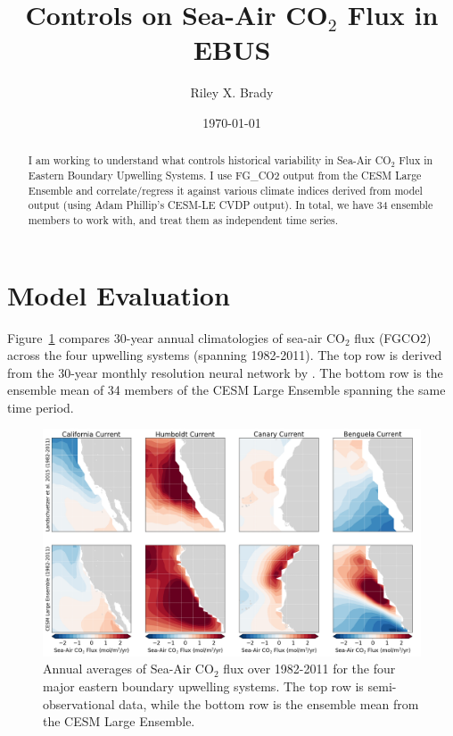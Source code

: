 \documentclass[12pt]{article}
\title{Controls on Sea-Air CO$_{2}$ Flux in EBUS}
\author{Riley X. Brady}
\date{\today}
\begin{document}
\maketitle
\begin{abstract}
\noindent I am working to understand what controls historical variability in Sea-Air CO$_{2}$ Flux in Eastern Boundary Upwelling Systems. I use FG\_CO2 output from the CESM Large Ensemble and correlate/regress it against various climate indices derived from model output (using Adam Phillip's CESM-LE CVDP output). In total, we have 34 ensemble members to work with, and treat them as independent time series.
\end{abstract}

\newpage
\section{Model Evaluation}
Figure~\ref{fig:evaluation} compares 30-year annual climatologies of sea-air CO$_{2}$ flux (FGCO2) across the four upwelling systems (spanning 1982-2011). The top row is derived from the 30-year monthly resolution neural network by \citet{Landschutzer2012}. The bottom row is the ensemble mean of 34 members of the CESM Large Ensemble spanning the same time period.

\begin{figure}[!h]
	\centering
	\includegraphics[width=\linewidth]{../../figs/all-systems/landschuetzer-model-climatological-comparison.png}
	\caption{Annual averages of Sea-Air CO$_{2}$ flux over 1982-2011 for the four major eastern boundary upwelling systems. The top row is semi-observational data, while the bottom row is the ensemble mean from the CESM Large Ensemble.}
	\label{fig:evaluation}
\end{figure}
\end{document}
